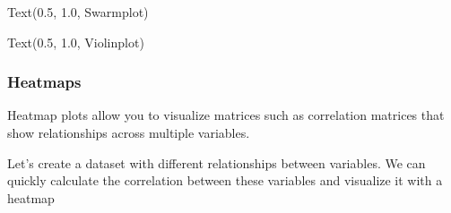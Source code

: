 \documentclass[letterpaper,10pt,english]{sphinxmanual}
\begin{document}
\begin{sphinxVerbatim}[commandchars=\\\{\}]
Text(0.5, 1.0, \PYGZsq{}Swarmplot\PYGZsq{})
\end{sphinxVerbatim}

\noindent{}

\begin{sphinxVerbatim}[commandchars=\\\{\}]
     
 
\end{sphinxVerbatim}

\begin{sphinxVerbatim}[commandchars=\\\{\}]
Text(0.5, 1.0, \PYGZsq{}Violinplot\PYGZsq{})
\end{sphinxVerbatim}

\noindent{}


\subsubsection{Heatmaps}
\label{\detokenize{content/Introduction_to_Plotting:heatmaps}}
Heatmap plots allow you to visualize matrices such as correlation matrices that show relationships across multiple variables.

Let’s create a dataset with different relationships between variables. We can quickly calculate the correlation between these variables and visualize it with a heatmap
\end{document}
